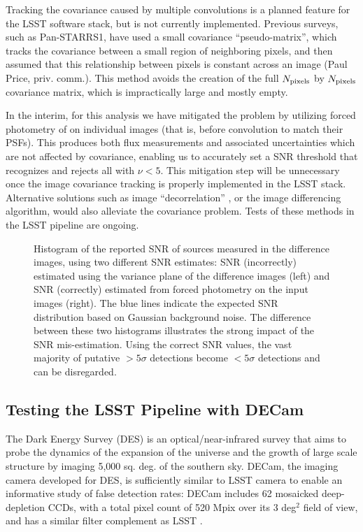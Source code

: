Tracking the covariance caused by multiple convolutions is a planned feature for
the LSST software stack, but is not currently implemented. Previous surveys, such as
Pan-STARRS1, have used a small covariance ``pseudo-matrix'', which tracks the
covariance between a small region of neighboring pixels, and then assumed that
this relationship between pixels is constant across an image (Paul Price, priv. comm.).
This method avoids the creation of the full $N_{\rm pixels}$ by $N_{\rm pixels}$
covariance matrix, which is impractically large and mostly empty.

In the interim, for this analysis we have mitigated the problem by utilizing forced photometry of \DIASources
on individual images (that is, before convolution to match their PSFs). This
produces both flux measurements and associated uncertainties which are not
affected by covariance, enabling us to accurately set a SNR threshold
that recognizes and rejects all \DIASources with $\nu < 5$. This mitigation step
will be unnecessary once the image covariance tracking is properly implemented
in the LSST stack. Alternative solutions such as image ``decorrelation''
\citep{DMTN-021}, or the \citet{zackay} image differencing algorithm, would also
alleviate the covariance problem. Tests of these methods in the LSST pipeline are ongoing.


\begin{figure}
  \centering
  \caption{
  Histogram of the reported SNR of sources measured in the difference images,
  using two different SNR estimates: SNR (incorrectly) estimated using the variance plane
  of the difference images (left) and SNR (correctly) estimated from forced photometry on
  the input images (right).  The blue lines indicate the expected SNR distribution
  based on Gaussian background noise. The difference between these two histograms
  illustrates the strong impact of the SNR mis-estimation. Using the correct SNR values,
  the vast majority of putative $>5 \sigma$ detections become $<5 \sigma$ detections
  and can be disregarded.
  }
  \label{fig:snr_comparison}
\end{figure}


\subsection{Testing the LSST Pipeline with DECam}

The Dark Energy Survey (DES) is an optical/near-infrared survey that aims to probe the
dynamics of the expansion of the universe and the growth of large scale structure by
imaging 5,000 sq. deg. of the southern sky. DECam, the imaging camera developed for
DES, is sufficiently similar to LSST camera to enable an informative study of false detection
rates: DECam includes 62 mosaicked deep-depletion CCDs, with a total pixel count of
520 Mpix over its 3 deg$^2$ field of view, and has a similar filter complement as LSST \citep{DECam}.

